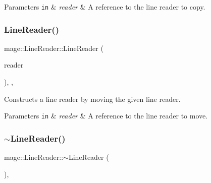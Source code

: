 \begin{DoxyParams}[1]{Parameters}
\mbox{\tt in}  & {\em reader} & A reference to the line reader to copy. \\
\hline
\end{DoxyParams}
\mbox{\label{classmage_1_1_line_reader_ae90c546a98e113a48ca1c94b854a4866}} 
\subsubsection{\texorpdfstring{Line\+Reader()}{LineReader()}\hspace{0.1cm}{\footnotesize\ttfamily [3/3]}}
{\footnotesize\ttfamily mage\+::\+Line\+Reader\+::\+Line\+Reader (\begin{DoxyParamCaption}\item[{\mbox{\hyperlink{classmage_1_1_line_reader}{Line\+Reader}} \&\&}]{reader }\end{DoxyParamCaption})\hspace{0.3cm}{\ttfamily [protected]}, {\ttfamily [default]}, {\ttfamily [noexcept]}}

Constructs a line reader by moving the given line reader.


\begin{DoxyParams}[1]{Parameters}
\mbox{\tt in}  & {\em reader} & A reference to the line reader to move. \\
\hline
\end{DoxyParams}
\mbox{\label{classmage_1_1_line_reader_ad9753ea392ebe5b3867852d3392fb1e7}} 
\subsubsection{\texorpdfstring{$\sim$\+Line\+Reader()}{~LineReader()}}
{\footnotesize\ttfamily mage\+::\+Line\+Reader\+::$\sim$\+Line\+Reader (\begin{DoxyParamCaption}{ }\end{DoxyParamCaption})\hspace{0.3cm}{\ttfamily [protected]}, {\ttfamily [default]}}

